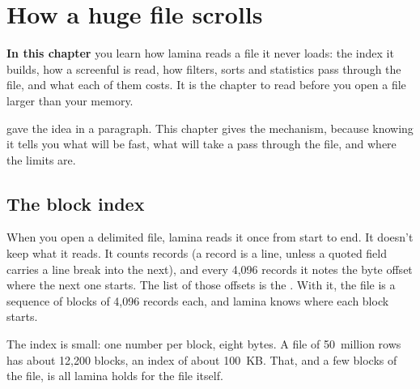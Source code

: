 \chapter{How a huge file scrolls}\label{ch:huge}
\begin{goals}
\textbf{In this chapter} you learn how lamina reads a file it never loads: the index it builds, how a
screenful is read, how filters, sorts and statistics pass through the file, and what each of them costs.
It is the chapter to read before you open a file larger than your memory.
\end{goals}

 gave the idea in a paragraph. This chapter gives the mechanism, because knowing it
tells you what will be fast, what will take a pass through the file, and where the limits are.

\section{The block index}\label{sec:block-index}

When you open a delimited file, lamina reads it once from start to end. It doesn't keep what it reads.
It counts records (a record is a line, unless a quoted field carries a line break into the next), and
every 4{,}096 records it notes the byte offset where the next one starts. The list of those offsets is the
. With it, the file is a sequence of blocks of 4{,}096 records each, and lamina knows
where each block starts.

The index is small: one number per block, eight bytes. A file of 50~million rows has about 12{,}200
blocks, an index of about 100~KB. That, and a few blocks of the file, is all lamina holds for the file
itself.

\begin{center}
\end{center}

